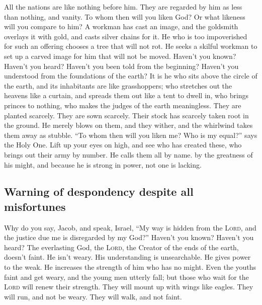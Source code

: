  All the nations are like nothing before him. They are
regarded by him as less than nothing, and vanity.  To
whom then will you liken God? Or what likeness will you compare to him?
 A workman has cast an image, and the goldsmith overlays
it with gold, and casts silver chains for it.  He who is
too impoverished for such an offering chooses a tree that will not rot.
He seeks a skilful workman to set up a carved image for him that will
not be moved.  Haven't you known? Haven't you heard?
Haven't you been told from the beginning? Haven't you understood from
the foundations of the earth?  It is he who sits above
the circle of the earth, and its inhabitants are like grasshoppers; who
stretches out the heavens like a curtain, and spreads them out like a
tent to dwell in,  who brings princes to nothing, who
makes the judges of the earth meaningless.  They are
planted scarcely. They are sown scarcely. Their stock has scarcely taken
root in the ground. He merely blows on them, and they wither, and the
whirlwind takes them away as stubble.  ``To whom then
will you liken me? Who is my equal?'' says the Holy One. 
Lift up your eyes on high, and see who has created these, who brings out
their army by number. He calls them all by name. by the greatness of his
might, and because he is strong in power, not one is lacking.

\hypertarget{warning-of-despondency-despite-all-misfortunes}{%
\subsection{Warning of despondency despite all
misfortunes}\label{warning-of-despondency-despite-all-misfortunes}}

 Why do you say, Jacob, and speak, Israel, ``My way is
hidden from the \textsc{Lord}, and the justice due me is disregarded by
my God?''  Haven't you known? Haven't you heard? The
everlasting God, the \textsc{Lord}, the Creator of the ends of the
earth, doesn't faint. He isn't weary. His understanding is unsearchable.
 He gives power to the weak. He increases the strength of
him who has no might.  Even the youths faint and get
weary, and the young men utterly fall;  but those who
wait for the \textsc{Lord} will renew their strength. They will mount up
with wings like eagles. They will run, and not be weary. They will walk,
and not faint.

